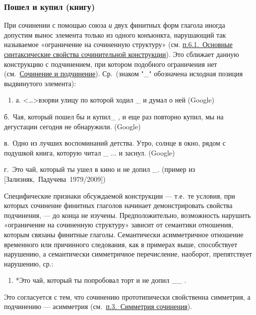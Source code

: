 \subsubsection{Пошел и купил
(книгу)}\label{ux43fux43eux448ux435ux43b-ux438-ux43aux443ux43fux438ux43b-ux43aux43dux438ux433ux443}

При сочинении с помощью союза \textit{и} двух финитных форм глагола иногда
допустим вынос элемента только из одного конъюнкта, нарушающий так
называемое «ограничение на сочиненную структуру» (см.
\underline{п.6.1.~Основные синтаксические свойства сочинительной
конструкции}). Это сближает данную конструкцию с подчинением, при
котором подобного ограничения нет (см.~\underline{Сочинение и
подчинение}). Ср.~(знаком "\_" обозначена исходная позиция выдвинутого
элемента):

\begin{enumerate}
\def\labelenumi{(\arabic{enumi})}
\setcounter{enumi}{55}
\item
  а. \textless\ldots\textgreater взорви улицу по которой ходил \_ и
  думал о ней (Google)
\end{enumerate}

б.~Чая, который пошел бы и купил\_ , и еще раз повторно купил, мы на
дегустации сегодня не обнаружили. (Google)

в.~Одно из лучших воспоминаний детства. Утро, солнце в окно, рядом с
подушкой книга, которую читал \_ ... и заснул. (Google)

г.~Это чай, который ты ушел в кино и не допил \_. (пример из
{[}Зализняк,~Падучева~1979/2009{]})

Специфические признаки обсуждаемой конструкции --- т.е.~те условия, при
которых сочинение финитных глаголов начинает демонстрировать свойства
подчинения, --- до конца не изучены. Предположительно, возможность
нарушить «ограничение на сочиненную структуру» зависит от семантики
отношения, которым связаны финитные глаголы. Семантически асимметричное
отношение временного или причинного следования, как в примерах выше,
способствует нарушению, а семантически симметричное перечисление,
наоборот, препятствует нарушению, ср.:

\begin{enumerate}
\def\labelenumi{(\arabic{enumi})}
\setcounter{enumi}{56}
\item
  *Это чай, который ты попробовал торт и не допил \_\_ .
\end{enumerate}

Это согласуется с тем, что сочинению прототипически свойственна
симметрия, а подчинению --- асимметрия (см.~\underline{п.3.~Симметрия
сочинения}).

